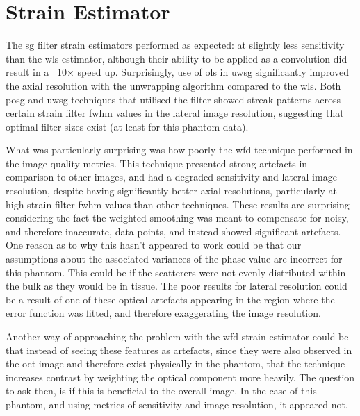 \section{Strain Estimator}

The \ac{sg} filter strain estimators performed as expected: at slightly less sensitivity than the \ac{wls} estimator, although their ability to be applied as a convolution did result in a ~10$\times$ speed up. Surprisingly, use of \ac{ols} in \ac{uwsg} significantly improved the axial resolution with the unwrapping algorithm compared to the \ac{wls}. Both \ac{posg} and \ac{uwsg} techniques that utilised the filter showed streak patterns across certain strain filter \ac{fwhm} values in the lateral image resolution, suggesting that optimal filter sizes exist (at least for this phantom data). 

What was particularly surprising was how poorly the \ac{wfd} technique performed in the image quality metrics. This technique presented strong artefacts in comparison to other images, and had a degraded sensitivity and lateral image resolution, despite having significantly better axial resolutions, particularly at high strain filter \ac{fwhm} values than other techniques.
These results are surprising considering the fact the weighted smoothing was meant to compensate for noisy, and therefore inaccurate, data points, and instead showed significant artefacts. One reason as to why this hasn't appeared to work could be that our assumptions about the associated variances of the phase value are incorrect for this phantom. This could be if the scatterers were not evenly distributed within the bulk as they would be in tissue. The poor results for lateral resolution could be a result of one of these optical artefacts appearing in the region where the error function was fitted, and therefore exaggerating the image resolution.

Another way of approaching the problem with the \ac{wfd} strain estimator could be that instead of seeing these features as artefacts, since they were also observed in the \ac{oct} image and therefore exist physically in the phantom, that the technique increases contrast by weighting the optical component more heavily. The question to ask then, is if this is beneficial to the overall image. In the case of this phantom, and using metrics of sensitivity and image resolution, it appeared not. 

